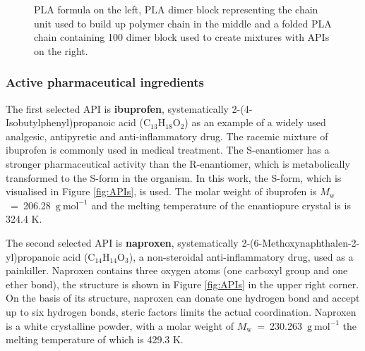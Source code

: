 \begin{figure}[htb]
\begin{subfigure}{0.33\textwidth}
	\end{subfigure}
	\caption{PLA formula on the left, PLA dimer block representing the chain unit used to build up polymer chain in the middle and a folded PLA chain containing 100 dimer block used to create mixtures with APIs on the right.}
	\vspace{-0.5cm}
	\label{fig:pla}
\end{figure}

\subsubsection{Active pharmaceutical ingredients}

The first selected API is \textbf{ibuprofen}, systematically 2-(4-Isobutylphenyl)propanoic acid (C$_{13}$H$_{18}$O$_{2}$) as an example of a widely used analgesic, antipyretic and  anti-inflammatory drug. The racemic mixture of ibuprofen is commonly used in medical treatment. The S-enantiomer has a stronger pharmaceutical activity than the R-enantiomer, which is metabolically transformed to the S-form in the organism. \cite{rainsford_ibuprofen_2009} In this work, the S-form, which is visualised in Figure \ref{fig:APIs}, is used. The molar weight of ibuprofen is $M_\mathrm{w}$~=~206.28~$\mathrm{g\ mol^{-1}}$ and the melting temperature of the enantiopure crystal is is 324.4 K. \cite{stejfa_heat_2021} 

The second selected API is \textbf{naproxen}, systematically 2-(6-Methoxynaphthalen-2-yl)propanoic acid (C$_{14}$H$_{14}$O$_{3}$), a non-steroidal anti-inflammatory drug, used as a painkiller. Naproxen contains three oxygen atoms (one carboxyl group and one ether bond), the structure is shown in Figure \ref{fig:APIs} in the upper right corner. On the basis of its structure, naproxen can donate one hydrogen bond and accept up to six hydrogen bonds, steric factors limits the actual coordination. Naproxen is a white crystalline powder, with a molar weight of $M_\mathrm{w}$~=~230.263~$\mathrm{g\ mol^{-1}}$ the melting temperature of which is 429.3 K. \cite{stejfa_heat_2021}


